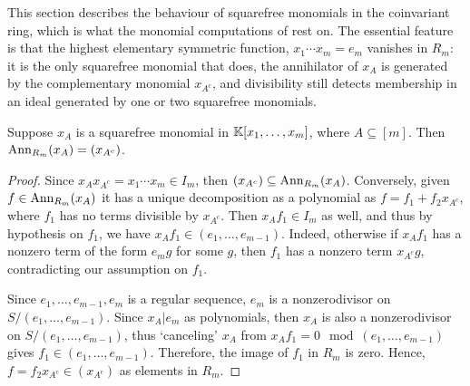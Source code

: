 This section describes the behaviour of squarefree monomials in the coinvariant ring, which is what the monomial computations of  rest on. The essential feature is that the highest elementary symmetric function, $x_1 \cdots x_m = e_m$ vanishes in $R_m$: it is the only squarefree monomial that does, the annihilator of $x_A$ is generated by the complementary monomial $x_{A^c}$, and divisibility still detects membership in an ideal generated by one or two squarefree monomials.


\begin{lemma}
\label{lem:ann-squarefree-proofonly}
Suppose $x_A$ is a squarefree monomial in $\mathbb{K}[x_1,\dots,x_m]$, where $A\subseteq [m]$. Then 
$\operatorname{Ann}_{R_m}(x_A)=(x_{A^c})$.
\end{lemma}

\begin{proof}
    Since $x_Ax_{A^c} = x_1\cdots x_m\in I_m$, then $(x_{A^c})\subseteq \operatorname{Ann}_{R_m}(x_A)$. 
    Conversely, given $f\in \operatorname{Ann}_{R_m}(x_A)$ it has a unique decomposition as a polynomial as $f = f_1 + f_2x_{A^c}$, where $f_1$ has no terms divisible by $x_{A^c}$. Then $x_Af_1\in I_m$ as well, and thus by hypothesis on $f_1$, we have $x_Af_1\in (e_1,\dots, e_{m-1})$. Indeed, otherwise if $x_Af_1$ has a nonzero term of the form $e_mg$ for some $g$, then $f_1$ has a nonzero term $x_{A^c}g$, contradicting our assumption on $f_1$.
    
    Since $e_1,\dots, e_{m-1},e_m$ is a regular sequence, $e_m$ is a nonzerodivisor on $S/(e_1,\dots, e_{m-1})$. Since $x_A|e_m$ as polynomials, then $x_A$ is also a nonzerodivisor on $S/(e_1,\dots, e_{m-1})$, thus `canceling' $x_A$ from $x_Af_1 = 0\mod (e_1,\dots, e_{m-1})$ gives $f_1\in (e_1,\dots, e_{m-1})$. Therefore, the image of $f_1$ in $R_m$ is zero. Hence, $f = f_2x_{A^c}\in (x_{A^c})$ as elements in $R_m$. 
\end{proof}

